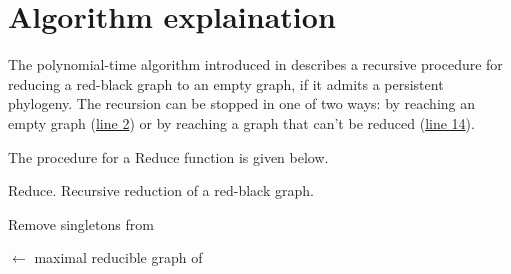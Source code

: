 
\section{Algorithm explaination}\label{section:algorithm}

The polynomial-time algorithm introduced in \cite{PPPptime2016} describes a recursive procedure for reducing a red-black graph to an empty graph, if it admits a persistent phylogeny.
The recursion can be stopped in one of two ways: by reaching an empty graph (\hyperref[algorithm:reduce:ifempty]{line 2}) or by reaching a graph that can't be reduced (\hyperref[algorithm:reduce:ifnosource]{line 14}).

The procedure for a Reduce function is given below.

\begin{algorithm}[h]\label{algorithm:reduce}
  \caption{Reduce. Recursive reduction of a red-black graph.}



  \BlankLine

  Remove singletons from \grb{}


  \BlankLine


  \BlankLine


  \BlankLine


  \BlankLine

  \gm{} $\gets$ maximal reducible graph of \grb{}


\end{algorithm}
